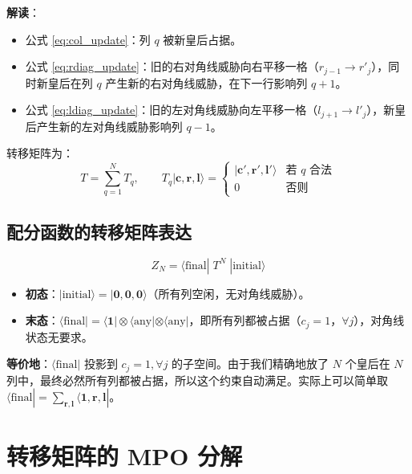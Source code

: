 \documentclass[12pt,a4paper]{ctexart}
\begin{document}
\textbf{解读}：
\begin{itemize}
    \item 公式 \eqref{eq:col_update}：列 $q$ 被新皇后占据。
    \item 公式 \eqref{eq:rdiag_update}：旧的右对角线威胁向右平移一格（$r_{j-1} \to r'_j$），同时新皇后在列 $q$ 产生新的右对角线威胁，在下一行影响列 $q+1$。
    \item 公式 \eqref{eq:ldiag_update}：旧的左对角线威胁向左平移一格（$l_{j+1} \to l'_j$），新皇后产生新的左对角线威胁影响列 $q-1$。
\end{itemize}

转移矩阵为：
\begin{equation}
T = \sum_{q=1}^{N} T_q, \qquad T_q |\mathbf{c}, \mathbf{r}, \mathbf{l}\rangle = \begin{cases} |\mathbf{c}', \mathbf{r}', \mathbf{l}'\rangle & \text{若 $q$ 合法} \\ 0 & \text{否则} \end{cases}
\end{equation}

\subsection{配分函数的转移矩阵表达}

\begin{equation}
\boxed{
Z_N = \langle \text{final}| \; T^N \; |\text{initial}\rangle
}
\end{equation}

\begin{itemize}
    \item \textbf{初态}：$|\text{initial}\rangle = |\mathbf{0}, \mathbf{0}, \mathbf{0}\rangle$（所有列空闲，无对角线威胁）。
    \item \textbf{末态}：$\langle \text{final}| = \langle \mathbf{1}| \otimes \langle \text{any}| \otimes \langle \text{any}|$，即所有列都被占据（$c_j = 1$，$\forall j$），对角线状态无要求。
\end{itemize}

\textbf{等价地}：$\langle \text{final}|$ 投影到 $c_j = 1, \forall j$ 的子空间。由于我们精确地放了 $N$ 个皇后在 $N$ 列中，最终必然所有列都被占据，所以这个约束自动满足。实际上可以简单取 $\langle \text{final}| = \sum_{\mathbf{r}, \mathbf{l}} \langle \mathbf{1}, \mathbf{r}, \mathbf{l}|$。

\section{转移矩阵的 MPO 分解}
\end{document}
